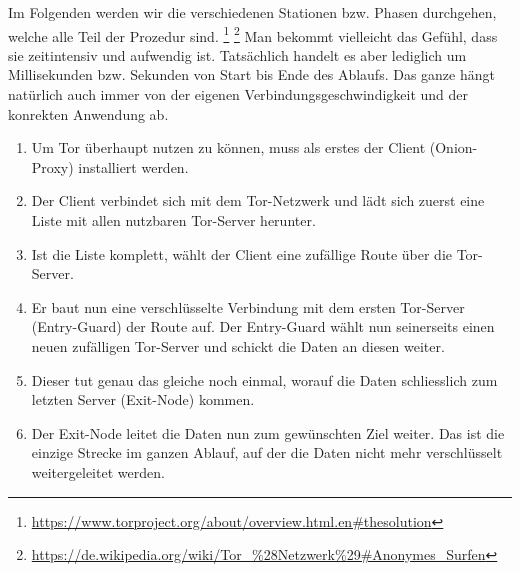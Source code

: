 Im Folgenden werden wir die verschiedenen Stationen bzw. Phasen durchgehen, welche alle Teil der Prozedur sind.
\footnote{\url{https://www.torproject.org/about/overview.html.en\#thesolution}}
\footnote{\url{https://de.wikipedia.org/wiki/Tor_\%28Netzwerk\%29\#Anonymes_Surfen}} 
Man bekommt vielleicht das Gefühl, dass sie zeitintensiv und aufwendig ist. Tatsächlich handelt es aber lediglich um Millisekunden bzw. Sekunden von Start bis Ende des Ablaufs. Das ganze hängt natürlich auch immer von der eigenen Verbindungsgeschwindigkeit und der konrekten Anwendung ab.

\begin{enumerate}
\item Um Tor überhaupt nutzen zu können, muss als erstes der  Client (Onion-Proxy) installiert werden.
\item Der Client verbindet sich mit dem Tor-Netzwerk und lädt sich zuerst eine Liste mit allen nutzbaren Tor-Server herunter.
\item Ist die Liste komplett, wählt der Client eine zufällige Route über die Tor-Server.
\item Er baut nun eine verschlüsselte Verbindung mit dem ersten Tor-Server (Entry-Guard) der Route auf. Der Entry-Guard wählt nun seinerseits einen neuen zufälligen Tor-Server und schickt die Daten an diesen weiter.
\item Dieser tut genau das gleiche noch einmal, worauf die Daten schliesslich zum letzten Server (Exit-Node) kommen.
\item Der Exit-Node leitet die Daten nun zum gewünschten Ziel weiter. Das ist die einzige Strecke im ganzen Ablauf, auf der die Daten nicht mehr verschlüsselt weitergeleitet werden.
\end{enumerate}

